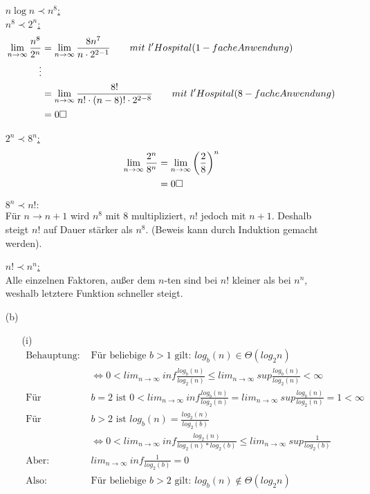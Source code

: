 \documentclass{article}
\begin{document}
\begin{enumerate}
\underline{$n \log n \prec n^8$:} \\



\underline{$n^8 \prec 2^n$:} \\
\begin{align*}
    \lim_{n \to \infty} \frac{n^8}{2^n} &= \lim_{n \to \infty}
        \frac{8n^7}{n \cdot 2^{2-1}} \qquad mit ~ l'Hospital (1-fache Anwendung) \\
        \vdots \\
        &= \lim_{n \to \infty} \frac{8!}{n! \cdot (n-8)! \cdot 2^{2-8}} \qquad mit ~ l'Hospital (8-fache Anwendung) \\
        &= 0 \hfill \square
\end{align*}

\underline{$2^n \prec 8^n$:} \\
\begin{align*}
    \lim_{n \to \infty} \frac{2^n}{8^n} &= \lim_{n \to \infty}
        \left( \frac{2}{8} \right)^n \\
        &= 0 \hfill \square
\end{align*}

\underline{$8^n \prec n!:$} \\
Für $n \to n+1$ wird $n^8$ mit 8 multipliziert, $n!$ jedoch mit $n+1$. Deshalb
steigt $n!$ auf Dauer stärker als $n^8$. (Beweis kann durch Induktion gemacht
werden).

\underline{$n! \prec n^n$:} \\
Alle einzelnen Faktoren, außer dem $n$-ten sind bei $n!$ kleiner als bei $n^n$,
weshalb letztere Funktion schneller steigt.

\item[(b)]

\begin{enumerate}
\item[(i)]
	\begin{align*}
	\text{Behauptung: } &\text{Für beliebige } b > 1 \text{ gilt: } log_b(n) \in \Theta(log_2n) \\
	&\Leftrightarrow 0 < lim_{n \rightarrow \infty}~ inf \frac{log_b(n)}{log_2(n)} \le 
		lim_{n \rightarrow \infty}~ sup \frac{log_b(n)}{log_2(n)} < \infty \\
	\text{Für } &b=2 \text{ ist } 0 <  lim_{n \rightarrow \infty}~ inf \frac{log_b(n)}{log_2(n)} 
		= lim_{n \rightarrow \infty}~ sup \frac{log_b(n)}{log_2(n)} = 1 < \infty \\
	\text{Für } &b>2 \text{ ist } log_b(n) = \frac{log_2(n)}{log_2(b)} \\
	&\Leftrightarrow 0 < lim_{n \rightarrow \infty}~ inf \frac{log_2(n)}{log_2(n)*log_2(b)} 
		\le lim_{n \rightarrow \infty}~ sup \frac{1}{log_2(b)} \\
	\text{Aber: } &lim_{n \rightarrow \infty}~ inf \frac{1}{log_2(b)} = 0  \\
	\text{Also: } &\text{Für beliebige } b > 2 \text{ gilt: } log_b(n) \notin \Theta(log_2n) \\   
	\end{align*}


\end{enumerate}
\end{enumerate}
\end{document}

